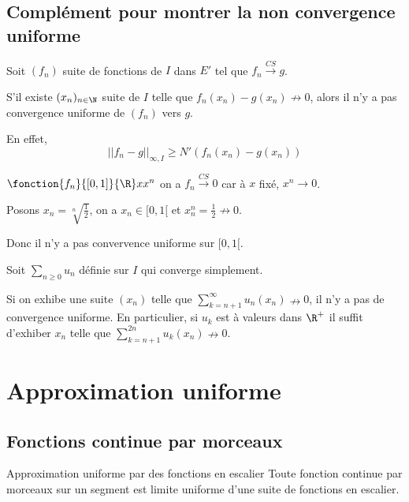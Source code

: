\subsection{Complément pour montrer la non convergence uniforme}

\begin{proposition}{}{}
    Soit $(f_n)$ suite de fonctions de $I$ dans $E'$ tel que $f_n \xrightarrow{CS} g$. 

    S'il existe $(x_n)_{n \in \N}$ suite de $I$ telle que 
    $f_n(x_n) - g(x_n) \nrightarrow 0$, alors il n'y a pas convergence uniforme de $(f_n)$ vers $g$.

    En effet, $$||f_n - g||_{\infty, I} \geqslant N'(f_n(x_n) - g(x_n))$$
\end{proposition}

\begin{exemple}
    $\fonction{f_n}{[0, 1]}{\R} x {x^n}$ on a $f_n \xrightarrow{CS} 0$
    car à $x$ fixé, $x^n \to 0$.

    Posons $x_n = \sqrt[n]{\frac 1 2}$, on a $x_n \in [0, 1[$ et 
    $x_n^n = \frac 1 2 \nrightarrow 0$. 

    Donc il n'y a pas convervence uniforme sur $[0, 1[$. 
\end{exemple}


\begin{proposition}{}{}
    Soit $\sum_{n \geqslant 0} u_n$ définie sur $I$ qui converge simplement. 

    Si on exhibe une suite $(x_n)$ telle que $\displaystyle \sum_{k = n + 1 }^{\infty  } u_n(x_n) \nrightarrow 0$,
    il n'y a pas de convergence uniforme. En particulier, si $u_k$ est à valeurs dans $\R^+$ il suffit 
    d'exhiber $x_n$ telle que $\displaystyle \sum_{k = n + 1}^{2n} u_k(x_n) \nrightarrow 0$.
\end{proposition}


\section{Approximation uniforme }
\subsection{Fonctions continue par morceaux }

\begin{theorement}{Approximation uniforme par des fonctions en escalier}{}
    Toute fonction continue par morceaux sur un segment est limite uniforme d'une suite 
    de fonctions en escalier. 
\end{theorement}

